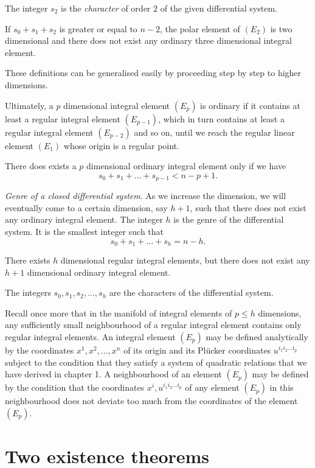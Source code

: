 The integer $s_{2}$ is the \emph{character} of order $2$ of the given differential system.

If $s_{0}+s_{1}+s_{2}$ is greater or equal to $n-2$, the polar element of $(E_{2})$ is two dimensional and there does not exist any ordinary three dimensional integral element.

These definitions can be generalised easily by proceeding step by step to higher dimensions.

Ultimately, a $p$ dimensional integral element $(E_{p})$ is ordinary if it contains at least a regular integral element $(E_{p-1})$, which in turn contains at least a regular integral element $(E_{p-2})$ and so on, until we reach the regular linear element $(E_{1})$ whose origin is a regular point.

There does  exists a $p$ dimensional ordinary integral element only if we have
\[
s_{0}+s_{1}+\dots+s_{p-1}<n-p+1.
\]

\vspace{12pt}\fsec \emph{Genre of a closed differential system}. As we increase the dimension, we will eventually come to a certain dimension, say $h+1$, such that there does not exist any ordinary integral element. The integer $h$ is  the genre of the differential system. It is the smallest integer such that
\[
s_{0}+s_{1}+\dots+s_{h}=n-h.
\]

There exists $h$ dimensional regular integral elements, but there does not exist any $h+1$ dimensional ordinary integral element.

The integers $s_{0},s_{1},s_{2},\dots,s_{h}$ are the characters of the differential system.

Recall once more that in the manifold of integral elements of $p\le h$ dimensions, any sufficiently small neighbourhood of a regular integral element contains only regular integral elements. An integral element $(E_{p})$ may be defined analytically by the coordinates $x^{1},x^{2},\dots,x^{n}$ of its origin and its Pl\"ucker coordinates $u^{i_{1}i_{2}\dots i_{p}}$ subject to the condition that they satisfy a system of quadratic relations that we have derived in chapter 1. A neighbourhood of an element $(E_{p})$ may be defined by the condition that the coordinates $x^{i},u^{i_{1}i_{2}\dots i_{p}}$ of any element $(E_{p})$ in this neighbourhood does not deviate too much from the coordinates of the element $(E_{p})$.

\section{Two existence theorems}
\label{sec:two-theor-exist}

